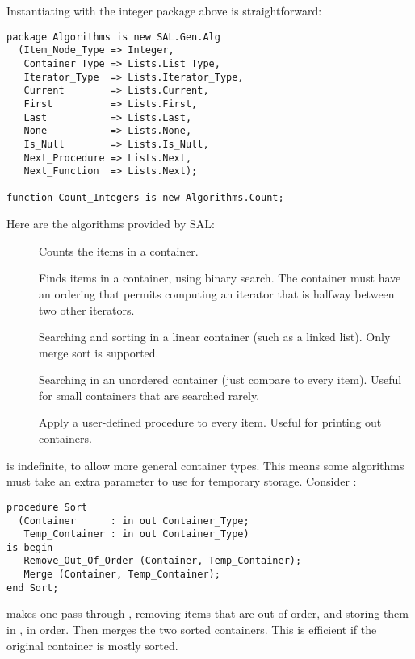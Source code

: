 \documentclass{article}
\begin{document}
Instantiating  with the integer 
package above is straightforward:
\begin{verbatim}
package Algorithms is new SAL.Gen.Alg
  (Item_Node_Type => Integer,
   Container_Type => Lists.List_Type,
   Iterator_Type  => Lists.Iterator_Type,
   Current        => Lists.Current,
   First          => Lists.First,
   Last           => Lists.Last,
   None           => Lists.None,
   Is_Null        => Lists.Is_Null,
   Next_Procedure => Lists.Next,
   Next_Function  => Lists.Next);

function Count_Integers is new Algorithms.Count;
\end{verbatim}

Here are the algorithms provided by SAL:
\begin{description}
\item [] Counts the items in a container.

\item [] Finds items in a container,
  using binary search. The container must have an ordering that permits
  computing an iterator that is halfway between two other iterators.

\item [] Searching and sorting
  in a linear container (such as a linked list). Only merge sort is
  supported.

\item [] Searching in an unordered
  container (just compare to every item). Useful for small containers
  that are searched rarely.

\item [] Apply a user-defined
  procedure to every item. Useful for printing out containers.

\end{description}

 is indefinite, to allow more general
container types. This means some algorithms must take an
extra parameter to use for temporary storage. Consider
:
\begin{verbatim}
procedure Sort
  (Container      : in out Container_Type;
   Temp_Container : in out Container_Type)
is begin
   Remove_Out_Of_Order (Container, Temp_Container);
   Merge (Container, Temp_Container);
end Sort;
\end{verbatim}
 makes one pass through ,
removing items that are out of order, and storing them in
, in order. Then  merges the two
sorted containers. This is efficient if the original container is
mostly sorted. 
\end{document}
